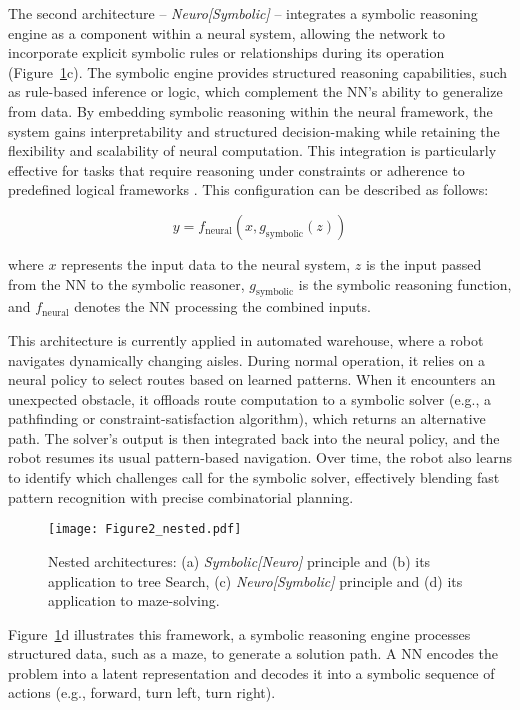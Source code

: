 \documentclass[12pt]{article}
\begin{document}
The second architecture -- \textit{Neuro[Symbolic]} --  integrates a symbolic reasoning engine as a component within a neural system, allowing the network to incorporate explicit symbolic rules or relationships during its operation (Figure~\ref{fig:nested}c). The symbolic engine provides structured reasoning capabilities, such as rule-based inference or logic, which complement the NN’s ability to generalize from data. By embedding symbolic reasoning within the neural framework, the system gains interpretability and structured decision-making while retaining the flexibility and scalability of neural computation. This integration is particularly effective for tasks that require reasoning under constraints or adherence to predefined logical frameworks \cite{heule2016solving, madan2021fast}. This configuration can be described as follows:

\begin{equation}
 y = f_\text{neural}(x, g_\text{symbolic}(z))   
\end{equation}

\noindent where $x$ represents the input data to the neural system, $z$ is the input passed from the NN to the symbolic reasoner, $g_\text{symbolic}$ is the symbolic reasoning function, and $f_\text{neural}$ denotes the NN processing the combined inputs.


This architecture is currently applied in automated warehouse, where a robot navigates dynamically changing aisles. During normal operation, it relies on a neural policy to select routes based on learned patterns. When it encounters an unexpected obstacle, it offloads route computation to a symbolic solver (e.g., a pathfinding or constraint-satisfaction algorithm), which returns an alternative path. The solver’s output is then integrated back into the neural policy, and the robot resumes its usual pattern-based navigation. Over time, the robot also learns to identify which challenges call for the symbolic solver, effectively blending fast pattern recognition with precise combinatorial planning.

\begin{figure}[!h]
    \centering
    \texttt{[image: Figure2\_nested.pdf]}
    \caption{Nested architectures: (a) \textit{Symbolic[Neuro]} principle and (b) its application to tree Search, (c) \textit{Neuro[Symbolic]} principle and (d) its application to maze-solving.}
    \label{fig:nested}
\end{figure}

\noindent Figure~\ref{fig:nested}d illustrates this framework, a symbolic reasoning engine processes structured data, such as a maze, to generate a solution path. A NN  encodes the problem into a latent representation and decodes it into a symbolic sequence of actions (e.g., forward, turn left, turn right).
\end{document}
